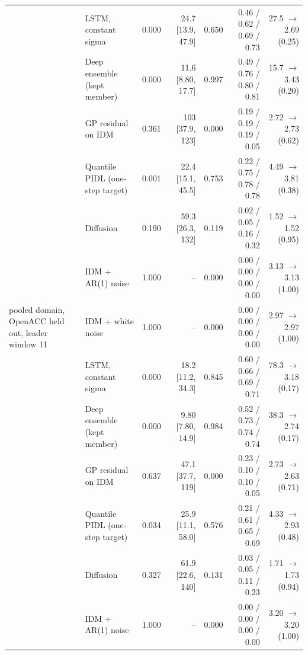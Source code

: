 \begin{longtable}{llrrrrr}
 & LSTM, constant sigma & 0.000 & 24.7 [13.9, 47.9] & 0.650 & 0.46 / 0.62 / 0.69 / 0.73 & 27.5 $\rightarrow$ 2.69 (0.25) \\
 & Deep ensemble (kept member) & 0.000 & 11.6 [8.80, 17.7] & 0.997 & 0.49 / 0.76 / 0.80 / 0.81 & 15.7 $\rightarrow$ 3.43 (0.20) \\
 & GP residual on IDM & 0.361 & 103 [37.9, 123] & 0.000 & 0.19 / 0.19 / 0.19 / 0.05 & 2.72 $\rightarrow$ 2.73 (0.62) \\
 & Quantile PIDL (one-step target) & 0.001 & 22.4 [15.1, 45.5] & 0.753 & 0.22 / 0.75 / 0.78 / 0.78 & 4.49 $\rightarrow$ 3.81 (0.38) \\
 & Diffusion & 0.190 & 59.3 [26.3, 132] & 0.119 & 0.02 / 0.05 / 0.16 / 0.32 & 1.52 $\rightarrow$ 1.52 (0.95) \\
 & IDM + AR(1) noise & 1.000 & -- & 0.000 & 0.00 / 0.00 / 0.00 / 0.00 & 3.13 $\rightarrow$ 3.13 (1.00) \\
\midrule
pooled domain, OpenACC held out, leader window 11 & IDM + white noise & 1.000 & -- & 0.000 & 0.00 / 0.00 / 0.00 / 0.00 & 2.97 $\rightarrow$ 2.97 (1.00) \\
 & LSTM, constant sigma & 0.000 & 18.2 [11.2, 34.3] & 0.845 & 0.60 / 0.66 / 0.69 / 0.71 & 78.3 $\rightarrow$ 3.18 (0.17) \\
 & Deep ensemble (kept member) & 0.000 & 9.80 [7.80, 14.9] & 0.984 & 0.52 / 0.73 / 0.74 / 0.74 & 38.3 $\rightarrow$ 2.74 (0.17) \\
 & GP residual on IDM & 0.637 & 47.1 [37.7, 119] & 0.000 & 0.23 / 0.10 / 0.10 / 0.05 & 2.73 $\rightarrow$ 2.63 (0.71) \\
 & Quantile PIDL (one-step target) & 0.034 & 25.9 [11.1, 58.0] & 0.576 & 0.21 / 0.61 / 0.65 / 0.69 & 4.33 $\rightarrow$ 2.93 (0.48) \\
 & Diffusion & 0.327 & 61.9 [22.6, 140] & 0.131 & 0.03 / 0.05 / 0.11 / 0.23 & 1.71 $\rightarrow$ 1.73 (0.94) \\
 & IDM + AR(1) noise & 1.000 & -- & 0.000 & 0.00 / 0.00 / 0.00 / 0.00 & 3.20 $\rightarrow$ 3.20 (1.00) \\
\end{longtable}
\endgroup
